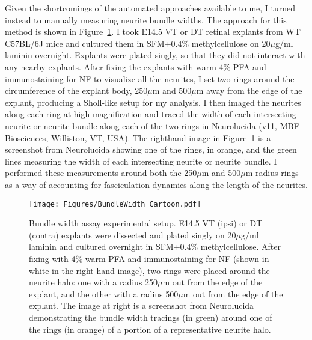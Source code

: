 Given the shortcomings of the automated approaches available to me, I turned instead to manually measuring neurite bundle widths.
The approach for this method is shown in Figure~\ref{Figures/BundleWidthCartoon}.
I took E14.5 VT or DT retinal explants from WT C57BL/6J mice and cultured them in SFM+0.4\% methylcellulose on 20$\mu$g/ml laminin overnight.
Explants were plated singly, so that they did not interact with any nearby explants.
After fixing the explants with warm 4\% PFA and immunostaining for NF to visualize all the neurites, I set two rings around the circumference of the explant body, 250$\mu$m and 500$\mu$m away from the edge of the explant, producing a Sholl-like setup for my analysis.
I then imaged the neurites along each ring at high magnification and traced the width of each intersecting neurite or neurite bundle along each of the two rings in Neurolucida (v11, MBF Biosciences, Williston, VT, USA).
The righthand image in Figure~\ref{Figures/BundleWidthCartoon} is a screenshot from Neurolucida showing one of the rings, in orange, and the green lines measuring the width of each intersecting neurite or neurite bundle.
I performed these measurements around both the 250$\mu$m and 500$\mu$m radius rings as a way of accounting for fasciculation dynamics along the length of the neurites.
\begin{figure}[hbtp]
    \begin{center}
        \texttt{[image: Figures/BundleWidth\_Cartoon.pdf]}
        \caption[Bundle width assay experimental setup.]
        {Bundle width assay experimental setup.
        E14.5 VT (ipsi) or DT (contra) explants were dissected and plated singly on 20$\mu$g/ml laminin and cultured overnight in SFM+0.4\% methylcellulose.
        After fixing with 4\% warm PFA and immunostaining for NF (shown in white in the right-hand image), two rings were placed around the neurite halo: one with a radius 250$\mu$m out from the edge of the explant, and the other with a radius 500$\mu$m out from the edge of the explant.
        The image at right is a screenshot from Neurolucida demonstrating the bundle width tracings (in green) around one of the rings (in orange) of a portion of a representative neurite halo.
        }
        \label{Figures/BundleWidthCartoon}
    \end{center}
\end{figure}

